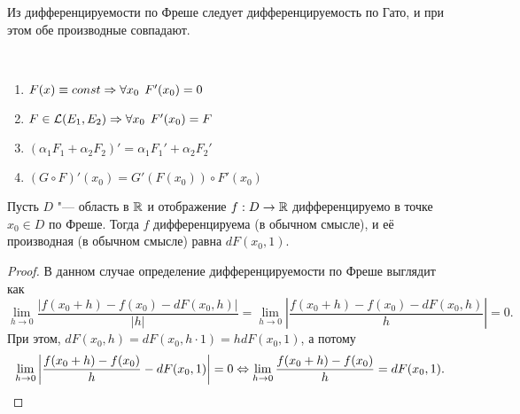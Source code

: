 \documentclass[main]{subfiles}
\begin{document}
\begin{exercise}
  Из дифференцируемости по Фреше следует дифференцируемость по
  Гато, и при этом обе производные совпадают.
\end{exercise}

\begin{exercise}~
  \begin{enumerate}
    \item \( F(x) \equiv const \Rightarrow \forall {x_0} \; \, F'(x_0) = 0 \)
    \item \( F \in \Linears{E_1, E_2} \To
      \Forall{x_0} F'(x_0) = F \)
    \item \( (\alpha_1 F_1 + \alpha_2 F_2)' =
      \alpha_1 F_1' + \alpha_2 F_2' \)
    \item \( (G \circ F)'(x_0) = G'(F(x_0)) \circ F'(x_0) \)
  \end{enumerate}
\end{exercise}

\begin{proposition*}
  Пусть \( D \) "--- область в \( \mathbb{R} \) и
  отображение \( f : D \to \mathbb{R} \)
  дифференцируемо в точке \( x_0 \in D \) по Фреше.
  Тогда \( f \) дифференцируема
  (в обычном смысле), и её производная
  (в обычном смысле)
  равна \( dF(x_0, 1) \).
\end{proposition*}
\begin{proof}
  В данном случае определение дифференцируемости
  по Фреше выглядит как
  \[
    \lim_{h \to 0} \frac{|f(x_0 + h) - f(x_0) - dF(x_0, h)|}{|h|} = 
    \lim_{h \to 0} \left| \frac{f(x_0 + h) - f(x_0) - dF(x_0, h)}{h} \right| = 0.
  \]
  При этом, \( dF(x_0, h) = dF(x_0, h \cdot 1) = h dF(x_0, 1) \),
  а потому
  \[
    \lim_{h \to 0} \left|
    \frac{f(x_0 + h) - f(x_0)}{h} - dF(x_0, 1)
    \right| = 0 \Leftrightarrow
    \lim_{h \to 0} \frac{f(x_0 + h) - f(x_0)}{h} = dF(x_0, 1).
    \qedhere
  \]
\end{proof}
\end{document}
